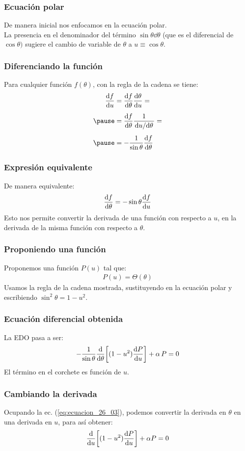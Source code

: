 \documentclass[12pt]{beamer}
\begin{document}
\begin{frame}
\frametitle{Ecuación polar}
De manera inicial nos enfocamos en la ecuación polar.
\\
\bigskip
\pause
La presencia en el denominador del término $\sin \theta \dd{\theta}$ (que es el diferencial de $\cos \theta)$ sugiere el cambio de variable de $\theta$ a $u \equiv \cos \theta$.
\end{frame}
\begin{frame}
\frametitle{Diferenciando la función}
Para cualquier función $f (\theta)$, con la regla de la cadena se tiene:
\pause
\begin{eqnarray*}
\begin{aligned}
\dv{f}{u} &= \dv{f}{\theta} \dv{\theta}{u} = \\[0.5em] \pause
&= \dv{f}{\theta} \dfrac{1}{\dv*{u}{\theta}} = \\[0.5em] \pause
&= - \dfrac{1}{\sin \theta} \dv{f}{\theta}
\end{aligned}
\end{eqnarray*}
\end{frame}
\begin{frame}
\frametitle{Expresión equivalente}
De manera equivalente:
\pause
\begin{align}
\dv{f}{\theta} = - \sin \theta \dv{f}{u}
\label{eq:ecuacion_26_03}
\end{align}
\pause
Esto nos permite convertir la derivada de una función con respecto a $u$, en la derivada de la misma función con respecto a $\theta$.
\end{frame}
\begin{frame}
\frametitle{Proponiendo una función}
Proponemos una función $P(u)$ tal que:
\pause
\begin{align*}
P(u) = \Theta(\theta)
\end{align*}
Usamos la regla de la cadena mostrada, sustituyendo en la ecuación polar y escribiendo $\sin^{2} \theta = 1 - u^{2}$.
\end{frame}
\begin{frame}
\frametitle{Ecuación diferencial obtenida}
La EDO pasa a ser:
\pause
\begin{align*}
- \dfrac{1}{\sin \theta} \dv{\theta} \bigg[ (1 - u^{2}) \dv{P}{u} \bigg] + \alpha \, P = 0
\end{align*}
El término en el corchete es función de $u$.
\end{frame}
\begin{frame}
\frametitle{Cambiando la derivada}
Ocupando la ec. (\ref{eq:ecuacion_26_03}), podemos convertir la derivada en $\theta$ en una derivada en $u$, para así obtener:
\pause
\begin{align}
\dv{u} \bigg[ (1 - u^{2}) \dv{P}{u} \bigg] + \alpha P = 0
\label{eq:ecuacion_26_04}
\end{align}
\end{frame}
\end{document}
